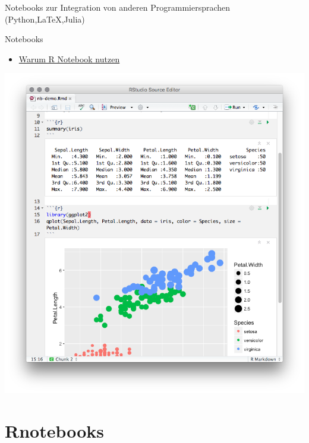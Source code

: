 \documentclass[ignorenonframetext,]{beamer}
\providecommand{\tightlist}{%
\setlength{\itemsep}{0pt}\setlength{\parskip}{0pt}}
\begin{document}
\begin{frame}{Notebooks zur Integration von anderen Programmiersprachen
(Python,LaTeX,Julia)}

\end{frame}

\begin{frame}{Notebooks}

\begin{itemize}
\tightlist
\item
  \href{https://news.ycombinator.com/item?id=12683625}{Warum R Notebook
  nutzen}
\end{itemize}

\includegraphics{./tex2pdf.956/0b0d6667ad450fca127b308a6948cf371e84d658.png}

\end{frame}

\section{Rnotebooks}\label{rnotebooks}
\end{document}
